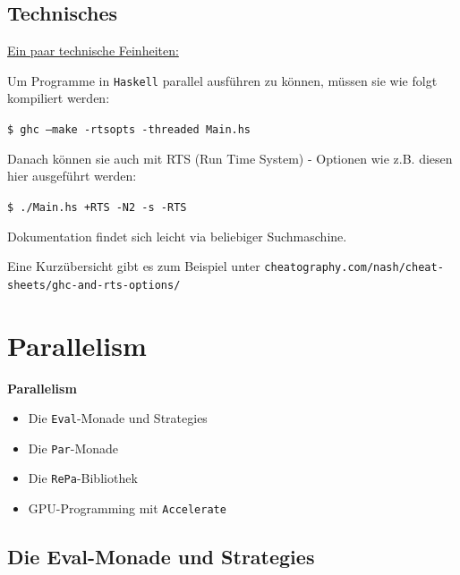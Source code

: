 \documentclass{beamer}
\begin{document}
\subsection{Technisches}

\begin{frame}[fragile]
\underline{Ein paar technische Feinheiten:}\pause\bigskip

Um Programme in \texttt{Haskell} parallel ausführen zu können, müssen sie wie folgt
kompiliert werden:\smallskip

\texttt{\$ ghc --make -rtsopts -threaded Main.hs}
\pause
\bigskip

Danach können sie auch mit RTS (Run Time System) - Optionen wie z.B. diesen hier ausgeführt werden:\smallskip

\texttt{\$ ./Main.hs +RTS -N2 -s -RTS}
\bigskip
\pause

Dokumentation findet sich leicht via beliebiger Suchmaschine.

Eine Kurzübersicht gibt es zum Beispiel unter \texttt{cheatography.com/nash/cheat-sheets/ghc-and-rts-options/}

\end{frame}


\section{Parallelism}

\begin{frame}

\begin{center}
\Large
\textbf{Parallelism}\normalsize\bigskip

\begin{itemize}
\item Die \texttt{Eval}-Monade und Strategies
\item Die \texttt{Par}-Monade
\item Die \texttt{RePa}-Bibliothek
\item GPU-Programming mit \texttt{Accelerate}
\end{itemize}
\end{center}

\end{frame}


\subsection{Die Eval-Monade und Strategies}
\end{document}
